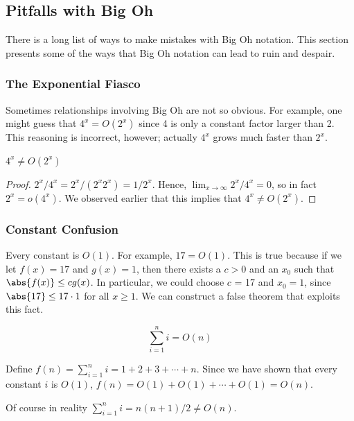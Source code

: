 \subsection{Pitfalls with Big Oh}

There is a long list of ways to make mistakes with Big Oh notation.
This section presents some of the ways that Big Oh notation can lead
to ruin and despair.

\subsubsection{The Exponential Fiasco}

Sometimes relationships involving Big Oh are not so obvious.  For
example, one might guess that $4^x = O(2^x)$ since 4 is only a
constant factor larger than 2.  This reasoning is incorrect,
however; actually $4^x$ grows much faster than $2^x$.

\begin{proposition}
$4^x \neq O(2^x)$
\end{proposition}

\begin{proof}
$2^x/4^x = 2^x/(2^x2^x) = 1/2^x$.  Hence, $\lim_{x \rightarrow \infty}
2^x/4^x = 0$, so in fact $2^x = o(4^x)$.  We observed earlier that this
implies that $4^x \neq O(2^x)$.
\end{proof}

\subsubsection{Constant Confusion}

Every constant is $O(1)$.  For example, $17 = O(1)$.  This is true because
if we let $f(x) = 17$ and $g(x) = 1$, then there exists a $c > 0$ and an
$x_0$ such that $\abs{f(x)} \leq c g(x)$.  In particular, we could choose
$c$ = 17 and $x_0 = 1$, since $\abs{17} \leq 17 \cdot 1$ for all $x \geq
1$.  We can construct a false theorem that exploits this fact.

\begin{falsethm}
\[
\sum_{i=1}^n i = O(n)
\]
\end{falsethm}

\begin{falseproof}
Define $f(n) = \sum_{i=1}^n i = 1 + 2 + 3 + \cdots + n$.  Since we
have shown that every constant $i$ is $O(1)$, $f(n) = O(1) + O(1) +
\cdots + O(1) = O(n)$.
\end{falseproof}

Of course in reality $\sum_{i=1}^n i = n(n+1)/2 \neq O(n)$.

